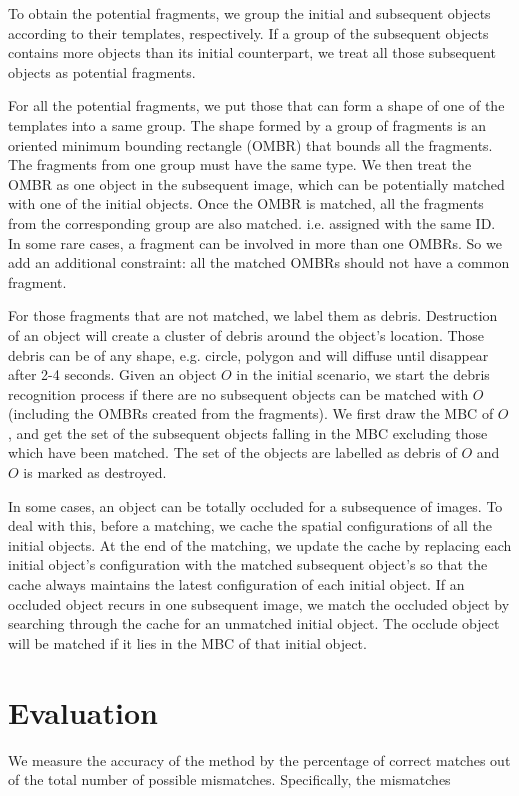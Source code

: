 \documentclass[letterpaper]{article}
\begin{document}
To obtain the potential fragments, we group the initial and subsequent objects according to their templates, respectively. If a group of the subsequent objects contains more objects than its initial counterpart, we treat all those subsequent objects as potential fragments.  

For all the potential fragments, we put those that can form a shape of one of the templates into a same group. The shape formed by a group of fragments is an oriented minimum bounding rectangle (OMBR) that bounds all the fragments. The fragments from one group must have the same type. We then treat the OMBR as one object in the subsequent image, which can be potentially matched with one of the initial objects. Once the OMBR is matched, all the fragments from the corresponding group are also matched. i.e. assigned with the same ID. In some rare cases, a fragment can be involved in more than one OMBRs. So we add an additional constraint: all the matched OMBRs should not have a common fragment. 

For those fragments that are not matched, we label them as debris. Destruction of an object will create a cluster of debris around the object's location. Those debris can be of any shape, e.g. circle, polygon and will diffuse until disappear after 2-4 seconds. Given an object $O$ in the initial scenario, we start the debris recognition process if there are no subsequent objects can be matched with $O$ (including the OMBRs created from the fragments). We first draw the MBC of $O$, and get the set of the subsequent objects falling in the MBC excluding those which have been matched. The set of the objects are labelled as debris of $O$ and $O$ is marked as destroyed. 

In some cases, an object can be totally occluded for a subsequence of images. To deal with this, before a matching, we cache the spatial configurations of all the initial objects. At the end of the matching, we update the cache by replacing each initial object's configuration with the matched subsequent object's so that the cache always maintains the latest configuration of each initial object. If an occluded object recurs in one subsequent image, we match the occluded object by searching through the cache for an unmatched initial object. The occlude object will be matched if it lies in the MBC of that initial object. 
  
\section{Evaluation}
We measure the accuracy of the method by the percentage of correct matches out of the total number of possible mismatches. Specifically, the mismatches 
\end{document}
